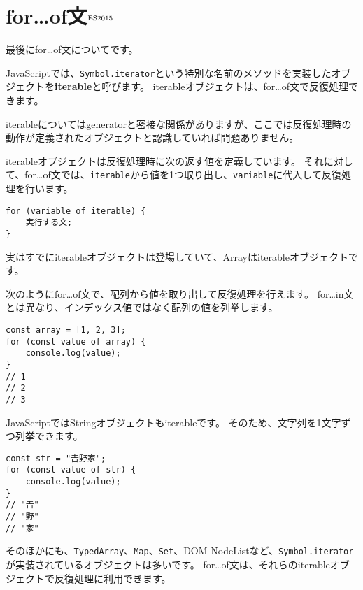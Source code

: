 \hypertarget{for-of-statement}{%
\section{for\ldots{}of文{$^{\rm ES2015}$}}\label{for-of-statement}}

最後にfor\ldots{}of文についてです。

JavaScriptでは、\texttt{Symbol.iterator}という特別な名前のメソッドを実装したオブジェクトを\textbf{iterable}と呼びます。
iterableオブジェクトは、for\ldots{}of文で反復処理できます。

iterableについてはgeneratorと密接な関係がありますが、ここでは反復処理時の動作が定義されたオブジェクトと認識していれば問題ありません。

iterableオブジェクトは反復処理時に次の返す値を定義しています。
それに対して、for\ldots{}of文では、\texttt{iterable}から値を1つ取り出し、\texttt{variable}に代入して反復処理を行います。

\begin{lstlisting}
for (variable of iterable) {
    実行する文;
}
\end{lstlisting}

実はすでにiterableオブジェクトは登場していて、Arrayはiterableオブジェクトです。

次のようにfor\ldots{}of文で、配列から値を取り出して反復処理を行えます。
for\ldots{}in文とは異なり、インデックス値ではなく配列の値を列挙します。

\begin{lstlisting}
const array = [1, 2, 3];
for (const value of array) {
    console.log(value);
}
// 1
// 2
// 3
\end{lstlisting}

JavaScriptではStringオブジェクトもiterableです。
そのため、文字列を1文字ずつ列挙できます。

\begin{lstlisting}
const str = "𠮷野家";
for (const value of str) {
    console.log(value);
}
// "𠮷"
// "野"
// "家"
\end{lstlisting}

そのほかにも、\texttt{TypedArray}、\texttt{Map}、\texttt{Set}、DOM
NodeListなど、\texttt{Symbol.iterator}が実装されているオブジェクトは多いです。
for\ldots{}of文は、それらのiterableオブジェクトで反復処理に利用できます。

